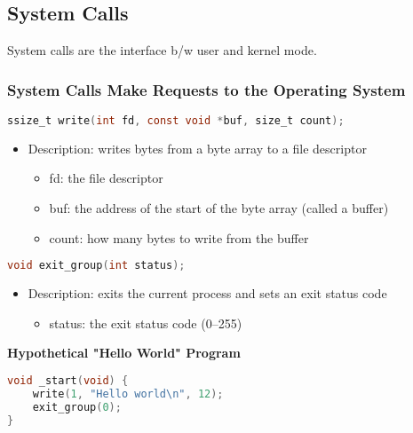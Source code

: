 \subsection{System Calls}
\begin{definition}
    System calls are the interface b/w user and kernel mode.
\end{definition}

\subsubsection{System Calls Make Requests to the Operating System}
\begin{definition}
\begin{lstlisting}[language=C]
ssize_t write(int fd, const void *buf, size_t count);
\end{lstlisting}
\begin{itemize}
    \item Description: writes bytes from a byte array to a file descriptor
    \begin{itemize}
        \item fd: the file descriptor
        \item buf: the address of the start of the byte array (called a buffer)
        \item count: how many bytes to write from the buffer
    \end{itemize}
\end{itemize}

\begin{lstlisting}[language=C]
void exit_group(int status);
\end{lstlisting}

\begin{itemize}
    \item Description: exits the current process and sets an exit status code
    \begin{itemize}
        \item status: the exit status code (0–255)
    \end{itemize}
\end{itemize}  
\end{definition}

\begin{example}
    \textbf{Hypothetical "Hello World" Program}
\begin{lstlisting}[language=C]
void _start(void) {
    write(1, "Hello world\n", 12);
    exit_group(0);
}
\end{lstlisting}
\end{example}

